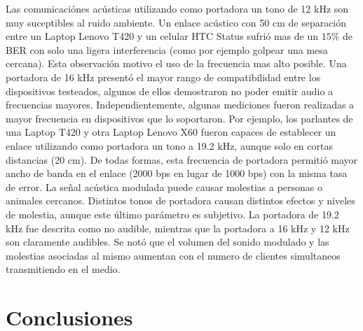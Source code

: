 Las comunicaciónes acústicas utilizando como portadora un tono de 12 kHz son muy suceptibles al ruido ambiente. Un enlace acústico con 50 cm de separación entre un Laptop Lenovo T420 y un celular HTC Status sufrió mas de un $15\%$ de BER con solo una ligera interferencia (como por ejemplo golpear una mesa cercana). Esta observación motivo el uso de la frecuencia mas alto posible. Una portadora de 16 kHz presentó el mayor rango de compatibilidad entre los dispositivos testeados, algunos de ellos demostraron no poder emitir audio a frecuencias mayores.
Independientemente, algunas mediciones fueron realizadas a mayor frecuencia en dispositivos que lo soportaron. Por ejemplo, los parlantes de una Laptop T420 y otra Laptop Lenovo X60 fueron capaces de establecer un enlace utilizando como portadora un tono a 19.2 kHz, aunque solo en cortas distancias (20 cm). De todas formas, esta frecuencia de portadora permitió mayor ancho de banda en el enlace (2000 bps en lugar de 1000 bps) con la misma tasa de error.
La señal acústica modulada puede causar molestias a personas o animales cercanos. Distintos tonos de portadora causan distintos efectos y niveles de molestia, aunque este último parámetro es subjetivo. La portadora de 19.2 kHz fue descrita como no audible, mientras que la portadora a 16 kHz y 12 kHz son claramente audibles. Se notó que el volumen del sonido modulado y las molestias asociadas al mismo aumentan con el numero de clientes simultaneos transmitiendo en el medio.

%

\section{Conclusiones}
